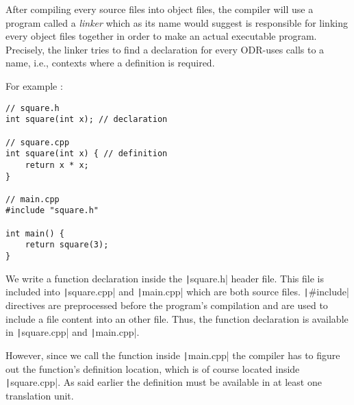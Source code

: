After compiling every source files into object files, the compiler will use a program called a \textit{linker} which as its name would suggest is responsible for linking every object files together in order to make an actual executable program. Precisely, the linker tries to find a declaration for every ODR-uses calls to a name, i.e., contexts where a definition is required.

\newpage

For example :

\begin{paracol}{2}
\begin{verbatim}
// square.h
int square(int x); // declaration

// square.cpp
int square(int x) { // definition
    return x * x;
}

// main.cpp
#include "square.h"

int main() {
    return square(3);
}
\end{verbatim}

\switchcolumn

We write a function declaration inside the \texttt|square.h| header file. This file is included into \texttt|square.cpp| and \texttt|main.cpp| which are both source files. \texttt|#include| directives are preprocessed before the program's compilation and are used to include a file content into an other file. Thus, the function declaration is available in \texttt|square.cpp| and \texttt|main.cpp|. 

However, since we call the function inside \texttt|main.cpp| the compiler has to figure out the function's definition location, which is of course located inside \texttt|square.cpp|. As said earlier the definition must be available in at least one translation unit.

\end{paracol}

